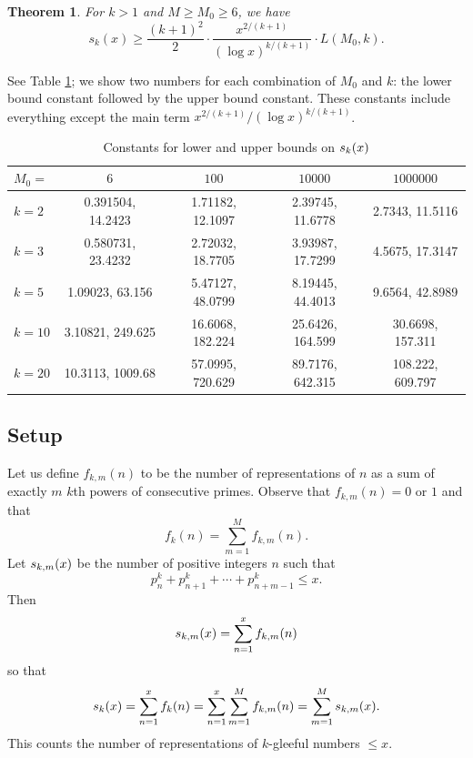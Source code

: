 \documentclass[11pt]{amsart}
\newcommand{\p}[1]{\left(#1\right)}
\newtheorem{thm}{Theorem}[section]
\numberwithin{equation}{section}
\numberwithin{algorithm}{section}
\begin{document}
 

\begin{thm}\label{thm:skxlower} For $k>1$ and $M\ge M_0\ge 6$, we have
$$ s_k(x) \ge \frac{(k+1)^2}{2} \cdot 
\frac{x^{2/(k+1)}}{(\log x)^{k/(k+1)}} \cdot L(M_0,k).$$

\end{thm}
See Table \ref{table:bounds}; we show two numbers for each combination of
$M_0$ and $k$: the lower bound constant followed by the upper bound constant.
These constants include everything except the main term
$x^{2/(k+1)}/(\log x)^{k/(k+1)}$.

\begin{table}[h]
    \centering
\begin{tabular}{l|c|c|c|c|}
$M_0=$ & $6$ & $100$ & $10000$ & $1000000$  \\ \hline
$k=2$  
 & 0.391504, 14.2423
 & 1.71182, 12.1097
 & 2.39745, 11.6778
 & 2.7343, 11.5116
 \\ 
$k=3$  
 & 0.580731, 23.4232
 & 2.72032, 18.7705
 & 3.93987, 17.7299
 & 4.5675, 17.3147
 \\ 
$k=5$  
 & 1.09023, 63.156
 & 5.47127, 48.0799
 & 8.19445, 44.4013
 & 9.6564, 42.8989
 \\ 
$k=10$  
 & 3.10821, 249.625
 & 16.6068, 182.224
 & 25.6426, 164.599
 & 30.6698, 157.311
 \\ 
$k=20$  
 & 10.3113, 1009.68
 & 57.0995, 720.629
 & 89.7176, 642.315
 & 108.222, 609.797
 \\ \hline
 \end{tabular}
    \caption{Constants for lower and upper bounds on ${s_k}(x)$}
    \label{table:bounds}
\end{table}

\subsection{Setup}

Let us define $f_{k,m}(n)$ to be the number of representations
  of $n$ as a sum of exactly $m$ $k$th powers of consecutive primes.
Observe that $f_{k,m}(n)=0$ or $1$ and that
$$
f_{k}(n)=\sum_{m=1}^M f_{k,m}(n).
$$
Let ${s_{k,m}}(x)$ be the number of positive integers $n$ such
  that
$$ p_n^k+p_{n+1}^k+\cdots+p_{n+m-1}^k\le x.$$
Then
$$
{s_{k,m}}(x)=\sum_{n=1}^x f_{k,m}(n)
$$
so that
$$ {s_k}(x)=\sum_{n=1}^x f_{k}(n)=\sum_{n=1}^x\sum_{m=1}^M f_{k,m}(n)=
\sum_{m=1}^{M} {s_{k,m}}(x).$$
This counts the number of representations of $k$-gleeful
numbers $\le x$.
\end{document}
